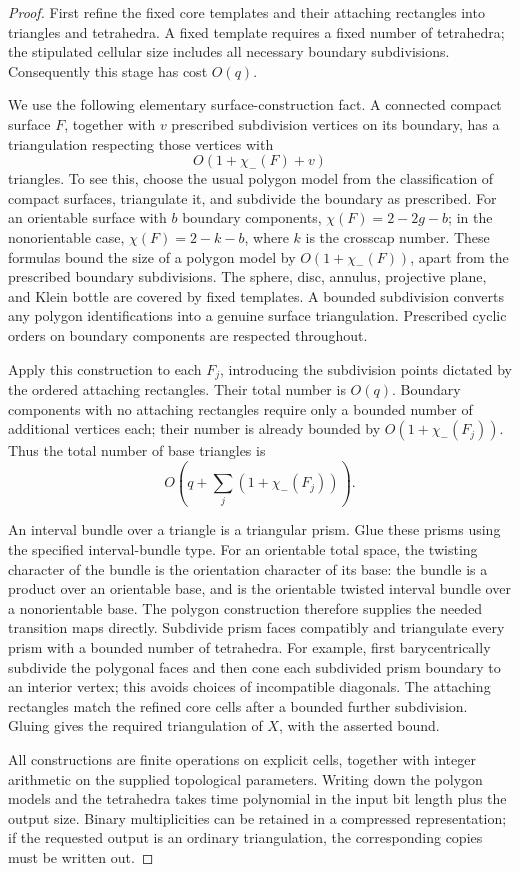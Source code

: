 \begin{proof}
First refine the fixed core templates and their attaching rectangles into
triangles and tetrahedra.  A fixed template requires a fixed number of
tetrahedra; the stipulated cellular size includes all necessary boundary
subdivisions.  Consequently this stage has cost $O(q)$.

We use the following elementary surface-construction fact.  A connected
compact surface $F$, together with $v$ prescribed subdivision vertices on
its boundary, has a triangulation respecting those vertices with
\[
  O(1+\chi_-(F)+v)
\]
triangles.  To see this, choose the usual polygon model from the classification
of compact surfaces, triangulate it, and subdivide the boundary as prescribed.
For an orientable surface with $b$ boundary components,
$\chi(F)=2-2g-b$; in the nonorientable case,
$\chi(F)=2-k-b$, where $k$ is the crosscap number.  These formulas bound the
size of a polygon model by $O(1+\chi_-(F))$, apart from the prescribed boundary
subdivisions.  The sphere, disc, annulus, projective plane, and Klein bottle
are covered by fixed templates.  A bounded subdivision converts any polygon
identifications into a genuine surface triangulation.  Prescribed cyclic
orders on boundary components are respected throughout.

Apply this construction to each $F_j$, introducing the subdivision points
dictated by the ordered attaching rectangles.  Their total number is $O(q)$.
Boundary components with no attaching rectangles require only a bounded
number of additional vertices each; their number is already bounded by
$O(1+\chi_-(F_j))$.  Thus the total number of base triangles is
\[
  O\!\left(q+\sum_j(1+\chi_-(F_j))\right).
\]

An interval bundle over a triangle is a triangular prism.  Glue these prisms
using the specified interval-bundle type.  For an orientable total space,
the twisting character of the bundle is the orientation character of its
base: the bundle is a product over an orientable base, and is the orientable
twisted interval bundle over a nonorientable base.  The polygon construction
therefore supplies the needed transition maps directly.  Subdivide prism
faces compatibly and triangulate every prism with a bounded number of
tetrahedra.  For example, first barycentrically subdivide the polygonal faces
and then cone each subdivided prism boundary to an interior vertex; this
avoids choices of incompatible diagonals.  The attaching rectangles match
the refined core cells after a bounded further subdivision.  Gluing gives
the required triangulation of $X$, with the asserted bound.

All constructions are finite operations on explicit cells, together with
integer arithmetic on the supplied topological parameters.  Writing down
the polygon models and the tetrahedra takes time polynomial in the input
bit length plus the output size.  Binary multiplicities can be retained in
a compressed representation; if the requested output is an ordinary
triangulation, the corresponding copies must be written out.
\end{proof}

